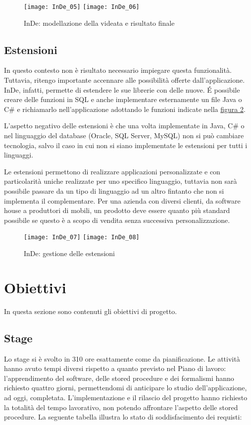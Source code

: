 \begin{figure}[!h] 
	\centering  
	\texttt{[image: InDe\_05]}
	\texttt{[image: InDe\_06]}
	 
	\caption{InDe: modellazione della videata e risultato finale}
	\label{InDe_videata}
\end{figure}


\subsection{Estensioni}
In questo contesto non è risultato necessario impiegare questa funzionalità. Tuttavia, ritengo importante accennare alle possibilità offerte dall'applicazione. InDe, infatti, permette di estendere le sue librerie con delle nuove. \'E possibile creare delle funzioni in SQL e anche implementare esternamente un file Java o C\# e richiamarlo nell'applicazione adottando le funzioni indicate nella \hyperref[InDe_estensioni]{figura \ref{InDe_estensioni}}. 

L'aspetto negativo delle estensioni è che una volta implementate in Java, C\# o nel linguaggio del database (Oracle, SQL Server, MySQL) non si può cambiare tecnologia, salvo il caso in cui non si siano implementate le estensioni per tutti i linguaggi. 

Le estensioni permettono di realizzare applicazioni personalizzate e con particolarità uniche realizzate per uno specifico linguaggio, tuttavia non sarà possibile passare da un tipo di linguaggio ad un altro fintanto che non si implementa il complementare. Per una azienda con diversi clienti, da software house a produttori di mobili, un prodotto deve essere quanto più standard possibile se questo è a scopo di vendita senza successiva personalizzazione. 

\begin{figure}[!h] 
	\centering  
	\texttt{[image: InDe\_07]}
	\texttt{[image: InDe\_08]}
	\caption{InDe: gestione delle estensioni}
	\label{InDe_estensioni}
\end{figure}


\section{Obiettivi}
In questa sezione sono contenuti gli obiettivi di progetto.

\subsection{Stage}
Lo stage si è svolto in 310 ore esattamente come da pianificazione. Le attività hanno avuto tempi diversi rispetto a quanto previsto nel Piano di lavoro: l'apprendimento del software, delle stored procedure e dei formalismi hanno richiesto quattro giorni, permettendomi di anticipare lo studio dell'applicazione, ad oggi, completata.  L'implementazione e il rilascio del progetto hanno richiesto la totalità del tempo lavorativo, non potendo affrontare l'aspetto delle stored procedure. 
La seguente tabella illustra lo stato di soddisfacimento dei requisti:


